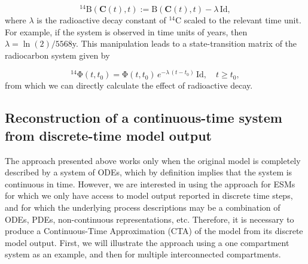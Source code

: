 \documentclass[draft]{agujournal2019}
\renewcommand{\vec}[1]{\mathbf{#1}}
\newcommand{\tens}[1]{\mathrm{#1}}
\newcommand{\id}{\tens{Id}}
\begin{document}
    \begin{equation*}
        {}^{14}\tens{B}(\vec{C}(t),t) := \tens{B}(\vec{C}(t),t) - \lambda\,\id,
    \end{equation*}
    where $\lambda$ is the radioactive decay constant of ${}^{14}$C scaled to the relevant time unit.
    For example, if the system is observed in time units of years, then $\lambda=\ln(2)/5568$y.
    This manipulation leads to a state-transition matrix of the radiocarbon system given by
    
    \begin{equation*}
        {}^{14}\tens{\Phi}(t,t_0) = \tens{\Phi}(t,t_0)\, e^{-\lambda\,(t-t_0)}\,\id, \quad t\geq t_0,
    \end{equation*}
    from which we can directly calculate the effect of radioactive decay.


\subsection{Reconstruction of a continuous-time system from discrete-time model output}
The approach presented above works only when the original model is completely described by a system of ODEs, which by definition implies that the system is continuous in time. However, we are interested in using the approach for ESMs for which we only have access to model output reported in discrete time steps, and for which the underlying process descriptions may be a combination of ODEs, PDEs, non-continuous representations, etc. Therefore, it is necessary to produce a Continuous-Time Approximation (CTA) of the model from its discrete model output. First, we will illustrate the approach using a one compartment system as an example, and then for multiple interconnected compartments. 
    
\end{document}
